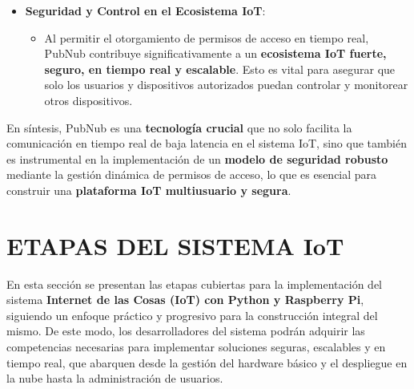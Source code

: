 \documentclass{report}
\begin{document}
\begin{itemize}
    \item \textbf{Seguridad y Control en el Ecosistema IoT}:
    \begin{itemize}
        \item Al permitir el otorgamiento de permisos de acceso en tiempo real, PubNub contribuye significativamente a un 
        \textbf{ecosistema IoT fuerte, seguro, en tiempo real y escalable}. Esto es vital para asegurar que solo los usuarios y 
        dispositivos autorizados puedan controlar y monitorear otros dispositivos.
    \end{itemize}
\end{itemize}
En síntesis, PubNub es una \textbf{tecnología crucial} que no solo facilita la comunicación en tiempo real de baja latencia en el 
sistema IoT, sino que también es instrumental en la implementación de un \textbf{modelo de seguridad robusto} mediante la gestión dinámica 
de permisos de acceso, lo que es esencial para construir una \textbf{plataforma IoT multiusuario y segura}.

\chapter{ETAPAS DEL SISTEMA IoT}
En esta sección se presentan las etapas cubiertas para la implementación del sistema \textbf{Internet de las 
Cosas (IoT) con Python y Raspberry Pi}, siguiendo un enfoque práctico y progresivo para la construcción integral 
del mismo. De este modo, los desarrolladores del sistema podrán adquirir las competencias necesarias para implementar 
soluciones seguras, escalables y en tiempo real, que abarquen desde la gestión del hardware básico y el despliegue en 
la nube hasta la administración de usuarios.
\end{document}
